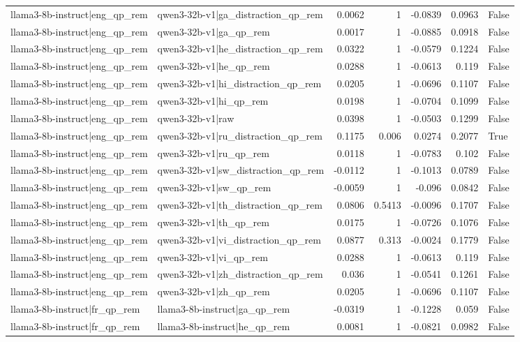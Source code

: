 \begin{table}
\begin{tabular}{l l r r r r l}
llama3-8b-instruct|eng_qp_rem & qwen3-32b-v1|ga_distraction_qp_rem & 0.0062 & 1 & -0.0839 & 0.0963 & False \\
llama3-8b-instruct|eng_qp_rem & qwen3-32b-v1|ga_qp_rem & 0.0017 & 1 & -0.0885 & 0.0918 & False \\
llama3-8b-instruct|eng_qp_rem & qwen3-32b-v1|he_distraction_qp_rem & 0.0322 & 1 & -0.0579 & 0.1224 & False \\
llama3-8b-instruct|eng_qp_rem & qwen3-32b-v1|he_qp_rem & 0.0288 & 1 & -0.0613 & 0.119 & False \\
llama3-8b-instruct|eng_qp_rem & qwen3-32b-v1|hi_distraction_qp_rem & 0.0205 & 1 & -0.0696 & 0.1107 & False \\
llama3-8b-instruct|eng_qp_rem & qwen3-32b-v1|hi_qp_rem & 0.0198 & 1 & -0.0704 & 0.1099 & False \\
llama3-8b-instruct|eng_qp_rem & qwen3-32b-v1|raw & 0.0398 & 1 & -0.0503 & 0.1299 & False \\
llama3-8b-instruct|eng_qp_rem & qwen3-32b-v1|ru_distraction_qp_rem & 0.1175 & 0.006 & 0.0274 & 0.2077 & True \\
llama3-8b-instruct|eng_qp_rem & qwen3-32b-v1|ru_qp_rem & 0.0118 & 1 & -0.0783 & 0.102 & False \\
llama3-8b-instruct|eng_qp_rem & qwen3-32b-v1|sw_distraction_qp_rem & -0.0112 & 1 & -0.1013 & 0.0789 & False \\
llama3-8b-instruct|eng_qp_rem & qwen3-32b-v1|sw_qp_rem & -0.0059 & 1 & -0.096 & 0.0842 & False \\
llama3-8b-instruct|eng_qp_rem & qwen3-32b-v1|th_distraction_qp_rem & 0.0806 & 0.5413 & -0.0096 & 0.1707 & False \\
llama3-8b-instruct|eng_qp_rem & qwen3-32b-v1|th_qp_rem & 0.0175 & 1 & -0.0726 & 0.1076 & False \\
llama3-8b-instruct|eng_qp_rem & qwen3-32b-v1|vi_distraction_qp_rem & 0.0877 & 0.313 & -0.0024 & 0.1779 & False \\
llama3-8b-instruct|eng_qp_rem & qwen3-32b-v1|vi_qp_rem & 0.0288 & 1 & -0.0613 & 0.119 & False \\
llama3-8b-instruct|eng_qp_rem & qwen3-32b-v1|zh_distraction_qp_rem & 0.036 & 1 & -0.0541 & 0.1261 & False \\
llama3-8b-instruct|eng_qp_rem & qwen3-32b-v1|zh_qp_rem & 0.0205 & 1 & -0.0696 & 0.1107 & False \\
llama3-8b-instruct|fr_qp_rem & llama3-8b-instruct|ga_qp_rem & -0.0319 & 1 & -0.1228 & 0.059 & False \\
llama3-8b-instruct|fr_qp_rem & llama3-8b-instruct|he_qp_rem & 0.0081 & 1 & -0.0821 & 0.0982 & False \\

\end{tabular}
\end{table}
